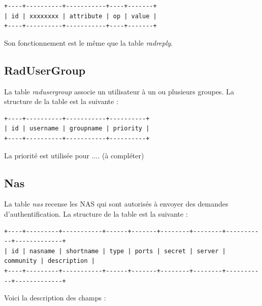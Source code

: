 \begin{verbatim}
+----+----------+-----------+----+-------+
| id | xxxxxxxx | attribute | op | value |
+----+----------+-----------+----+-------+
\end{verbatim}

Son fonctionnement est le même que la table \textit{radreply}.

\subsection{RadUserGroup}

La table \textit{radusergroup} associe un utilisateur à un ou plusieurs groupes. La structure de la table est la suivante :

\begin{verbatim}
+----+----------+-----------+----------+
| id | username | groupname | priority |
+----+----------+-----------+----------+
\end{verbatim}

La priorité est utilisée pour .... (à compléter)
\subsection{Nas}

La table \textit{nas} recense les NAS qui sont autorisés à envoyer des demandes d'authentification. La structure de la table est la suivante :

\begin{verbatim}
+----+---------+-----------+------+-------+--------+--------+-----------+-------------+
| id | nasname | shortname | type | ports | secret | server | community | description |
+----+---------+-----------+------+-------+--------+--------+-----------+-------------+
\end{verbatim}

Voici la description des champs :

